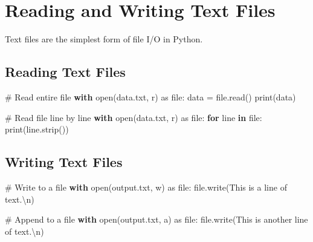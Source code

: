 \documentclass[
  letterpaper,
  DIV=11,
  numbers=noendperiod]{scrreprt}
\newenvironment{Shaded}{\begin{snugshade}}{\end{snugshade}}
\newcommand{\BuiltInTok}[1]{\textcolor[rgb]{0.00,0.23,0.31}{#1}}
\newcommand{\CharTok}[1]{\textcolor[rgb]{0.13,0.47,0.30}{#1}}
\newcommand{\CommentTok}[1]{\textcolor[rgb]{0.37,0.37,0.37}{#1}}
\newcommand{\ControlFlowTok}[1]{\textcolor[rgb]{0.00,0.23,0.31}{\textbf{#1}}}
\newcommand{\ImportTok}[1]{\textcolor[rgb]{0.00,0.46,0.62}{#1}}
\newcommand{\KeywordTok}[1]{\textcolor[rgb]{0.00,0.23,0.31}{\textbf{#1}}}
\newcommand{\NormalTok}[1]{\textcolor[rgb]{0.00,0.23,0.31}{#1}}
\newcommand{\OperatorTok}[1]{\textcolor[rgb]{0.37,0.37,0.37}{#1}}
\newcommand{\StringTok}[1]{\textcolor[rgb]{0.13,0.47,0.30}{#1}}
\begin{document}
\section{Reading and Writing Text
Files}\label{reading-and-writing-text-files-1}

Text files are the simplest form of file I/O in Python.

\subsection{Reading Text Files}\label{reading-text-files-1}

\begin{Shaded}
\begin{Highlighting}[]
\CommentTok{\# Read entire file}
\ControlFlowTok{with} \BuiltInTok{open}\NormalTok{(}\StringTok{\textquotesingle{}data.txt\textquotesingle{}}\NormalTok{, }\StringTok{\textquotesingle{}r\textquotesingle{}}\NormalTok{) }\ImportTok{as} \BuiltInTok{file}\NormalTok{:}
\NormalTok{    data }\OperatorTok{=} \BuiltInTok{file}\NormalTok{.read()}
    \BuiltInTok{print}\NormalTok{(data)}

\CommentTok{\# Read file line by line}
\ControlFlowTok{with} \BuiltInTok{open}\NormalTok{(}\StringTok{\textquotesingle{}data.txt\textquotesingle{}}\NormalTok{, }\StringTok{\textquotesingle{}r\textquotesingle{}}\NormalTok{) }\ImportTok{as} \BuiltInTok{file}\NormalTok{:}
    \ControlFlowTok{for}\NormalTok{ line }\KeywordTok{in} \BuiltInTok{file}\NormalTok{:}
        \BuiltInTok{print}\NormalTok{(line.strip())}
\end{Highlighting}
\end{Shaded}

\subsection{Writing Text Files}\label{writing-text-files-1}

\begin{Shaded}
\begin{Highlighting}[]
\CommentTok{\# Write to a file}
\ControlFlowTok{with} \BuiltInTok{open}\NormalTok{(}\StringTok{\textquotesingle{}output.txt\textquotesingle{}}\NormalTok{, }\StringTok{\textquotesingle{}w\textquotesingle{}}\NormalTok{) }\ImportTok{as} \BuiltInTok{file}\NormalTok{:}
    \BuiltInTok{file}\NormalTok{.write(}\StringTok{\textquotesingle{}This is a line of text.}\CharTok{\textbackslash{}n}\StringTok{\textquotesingle{}}\NormalTok{)}

\CommentTok{\# Append to a file}
\ControlFlowTok{with} \BuiltInTok{open}\NormalTok{(}\StringTok{\textquotesingle{}output.txt\textquotesingle{}}\NormalTok{, }\StringTok{\textquotesingle{}a\textquotesingle{}}\NormalTok{) }\ImportTok{as} \BuiltInTok{file}\NormalTok{:}
    \BuiltInTok{file}\NormalTok{.write(}\StringTok{\textquotesingle{}This is another line of text.}\CharTok{\textbackslash{}n}\StringTok{\textquotesingle{}}\NormalTok{)}
\end{Highlighting}
\end{Shaded}
\end{document}
